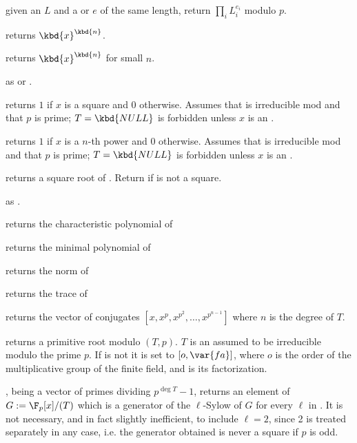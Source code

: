  given an  $L$
and a  or  $e$ of the same length, return $\prod_i L_i^{e_i}$
modulo $p$.

 returns $\kbd{x}^\kbd{n}$.

 returns $\kbd{x}^\kbd{n}$
for small $n$.

 as
 or .

 returns $1$ if $x$ is a square
and $0$ otherwise. Assumes that  is irreducible mod  and that
$p$ is prime; $T = \kbd{NULL}$ is forbidden unless $x$ is an .

 returns $1$ if $x$
is a $n$-th power and $0$ otherwise. Assumes that  is irreducible mod
 and that $p$ is prime; $T = \kbd{NULL}$ is forbidden unless $x$ is an
.

 returns a square root of .
Return  if  is not a square.

as .

 returns the characteristic
polynomial of 

 returns the minimal polynomial
of 

 returns the norm of 

 returns the trace of 

 returns the vector of conjugates
$[x,x^p,x^{p^2},\ldots,x^{p^{n-1}}]$ where $n$ is the degree of $T$.

 returns a primitive root modulo
$(T,p)$. $T$ is an  assumed to be irreducible modulo the prime
$p$. If  is not  it is set to $[o,\var{fa}]$, where $o$ is
the order of the multiplicative group of the finite field, and  is
its factorization.

,  being a vector of
primes dividing $p^{\deg T} - 1$, returns an element of $G:=\F_p[x]/(T)$
which is a generator of the $\ell$-Sylow of $G$ for every $\ell$ in
. It is not necessary, and in fact slightly inefficient, to include
$\ell=2$, since 2 is treated separately in any case, i.e. the generator
obtained is never a square if $p$ is odd.

